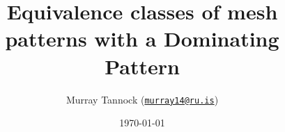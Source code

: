 \documentclass[11pt]{beamer}
\title[Dominating Patterns]{Equivalence classes of mesh patterns with a Dominating Pattern}
\author[M.~Tannock]{Murray Tannock (\href{mailto:murray14@ru.is}{\texttt{murray14@ru.is}})}
\institute[Reykjavik University]
{
\texttt{[image: rulogo]}
}
\date{\today}
\begin{document}
  \begin{frame}
    \titlepage
  \end{frame}



\end{document}
